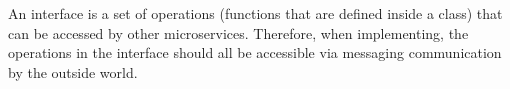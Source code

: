 An interface is a set of operations (functions that are defined inside a class) that can be accessed by other microservices. Therefore, when implementing, the operations in the interface should all be accessible via messaging communication by the outside world.



